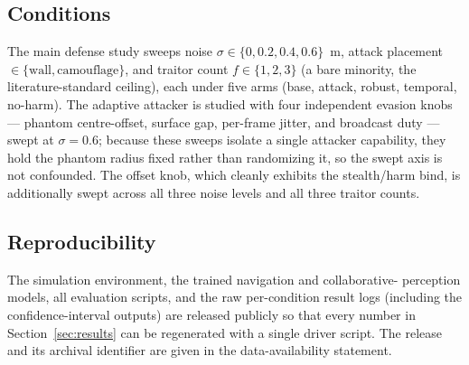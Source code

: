 \subsection{Conditions}\label{sec:setup-conditions}
The main defense study sweeps noise $\sigma\in\{0,0.2,0.4,0.6\}$~m, attack
placement $\in\{\text{wall},\text{camouflage}\}$, and traitor count
$f\in\{1,2,3\}$ (a bare minority, the literature-standard ceiling), each
under five arms (base, attack, robust, temporal, no-harm). The adaptive
attacker is studied with four independent evasion knobs --- phantom
centre-offset, surface gap, per-frame jitter, and broadcast duty --- swept
at $\sigma=0.6$; because these sweeps isolate a single attacker capability,
they hold the phantom radius fixed rather than randomizing it, so the swept
axis is not confounded. The offset knob, which cleanly exhibits the
stealth/harm bind, is additionally swept across all three noise levels and
all three traitor counts.

\subsection{Reproducibility}\label{sec:setup-repro}
The simulation environment, the trained navigation and collaborative-
perception models, all evaluation scripts, and the raw per-condition result
logs (including the confidence-interval outputs) are released publicly so
that every number in Section~\ref{sec:results} can be regenerated with a
single driver script. The release and its archival identifier are given in
the data-availability statement.
